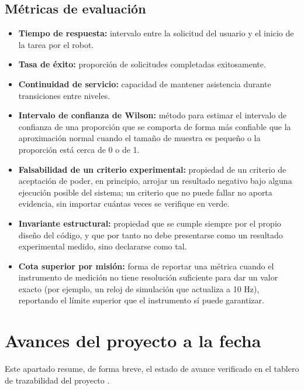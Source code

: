\documentclass[12pt,letterpaper]{article}
\begin{document}
\subsection{Métricas de evaluación}
\begin{itemize}[leftmargin=*]
    \item \textbf{Tiempo de respuesta:} intervalo entre la solicitud del usuario y el inicio de la tarea por el robot.
    \item \textbf{Tasa de éxito:} proporción de solicitudes completadas exitosamente.
    \item \textbf{Continuidad de servicio:} capacidad de mantener asistencia durante transiciones entre niveles.
    \item \textbf{Intervalo de confianza de Wilson:} método para estimar el intervalo de confianza de una proporción que se comporta de forma más confiable que la aproximación normal cuando el tamaño de muestra es pequeño o la proporción está cerca de 0 o de 1.
    \item \textbf{Falsabilidad de un criterio experimental:} propiedad de un criterio de aceptación de poder, en principio, arrojar un resultado negativo bajo alguna ejecución posible del sistema; un criterio que no puede fallar no aporta evidencia, sin importar cuántas veces se verifique en verde.
    \item \textbf{Invariante estructural:} propiedad que se cumple siempre por el propio diseño del código, y que por tanto no debe presentarse como un resultado experimental medido, sino declararse como tal.
    \item \textbf{Cota superior por misión:} forma de reportar una métrica cuando el instrumento de medición no tiene resolución suficiente para dar un valor exacto (por ejemplo, un reloj de simulación que actualiza a 10 Hz), reportando el límite superior que el instrumento sí puede garantizar.
\end{itemize}

\section{Avances del proyecto a la fecha}
\label{sec:avances}

Este apartado resume, de forma breve, el estado de avance verificado en el tablero de trazabilidad del proyecto \cite{estado_proyecto}.
\end{document}
